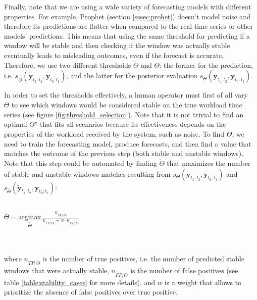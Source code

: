 \documentclass[a4paper, 12pt]{article} %
\begin{document}
	Finally, note that we are using a wide variety of forecasting models with different properties. For example, Prophet (section \ref{sssec:prohet}) doesn't model noise and therefore its predictions are flatter when compared to the real time series or other models' predictions. This means that using the same threshold for predicting if a window will be stable and then checking if the window was actually stable eventually leads to misleading outcomes, even if the forecast is accurate. Therefore, we use two different thresholds $\tilde{\Theta}$ and $\Theta$: the former for the prediction, i.e. $s_{\tilde{\Theta}}(\tilde{\pmb{y}}_{t_1:t_2}, \pmb{y}_{t_0:t_1})$, and the latter for the posterior evaluation $s_\Theta(\pmb{y}_{t_1:t_2}, \pmb{y}_{t_0:t_1})$.
	
	In order to set the thresholds effectively, a human operator must first of all vary $\Theta$ to see which windows would be considered stable on the true workload time series (see figure \ref{fig:threshold_selection}). Note that it is not trivial to find an optimal $\Theta^\star$ that fits all scenarios because its effectiveness depends on the properties of the workload received by the system, such as noise. To find $\tilde{\Theta}$, we need to train the forecasting model, produce forecasts, and then find a value that matches the outcome of the previous step (both stable and unstable windows). Note that this step could be automated by finding $\tilde{\Theta}$ that maximizes the number of stable and unstable windows matches resulting from $s_\Theta(\pmb{y}_{t_1:t_2}, \pmb{y}_{t_0:t_1})$ and $s_{\tilde{\Theta}}(\tilde{\pmb{y}}_{t_1:t_2}, \pmb{y}_{t_0:t_1})$: \\\\
	\centerline{
	$
		\tilde{\Theta} = \underset{ \tilde{\Theta}} {\mathrm{argmax}}\, \frac{n_{TP, \tilde{\Theta}} }{n_{TP, \tilde{\Theta}} + w \cdot n_{FP, \tilde{\Theta}}}
	$
	}\\\\
	where $n_{TP, \tilde{\Theta}}$ is the number of true positives, i.e. the number of predicted stable windows that were actually stable, $n_{FP, \tilde{\Theta}}$ is the number of false positives (see table \ref{table:stability_cases} for more details), and $w$ is a weight that allows to prioritize the absence of false positives over true positive.
	
\end{document}
